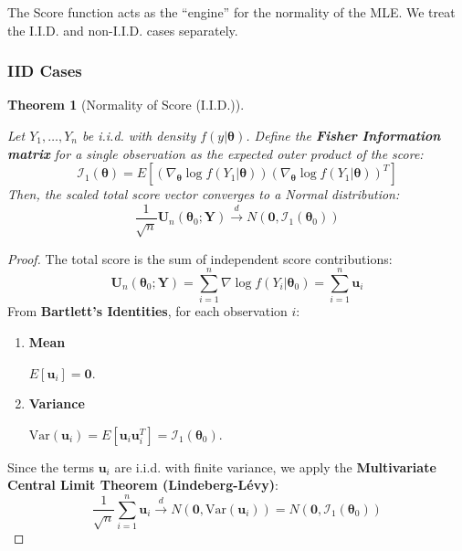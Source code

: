 \documentclass[
  letterpaper,
  DIV=11,
  numbers=noendperiod]{scrreprt}
\renewcommand{\[}{\begin{equation}}
\renewcommand{\]}{\end{equation}}
\theoremstyle{definition}
\theoremstyle{plain}
\theoremstyle{plain}
\theoremstyle{plain}
\newtheorem{theorem}{Theorem}[chapter]
\theoremstyle{definition}
\theoremstyle{plain}
\theoremstyle{remark}
\begin{document}
The Score function acts as the ``engine'' for the normality of the MLE.
We treat the I.I.D. and non-I.I.D. cases separately.

\subsubsection{IID Cases}\label{iid-cases-1}

\begin{theorem}[Normality of Score
(I.I.D.)]\protect\hypertarget{thm-score-normality-iid}{}\label{thm-score-normality-iid}

Let \(Y_1, \dots, Y_n\) be i.i.d. with density
\(f(y|\boldsymbol{\theta})\). Define the \textbf{Fisher Information
matrix} for a single observation as the expected outer product of the
score: \[
\mathcal{I}_1(\boldsymbol{\theta}) = E\left[ \left( \nabla_{\boldsymbol{\theta}} \log f(Y_1|\boldsymbol{\theta}) \right) \left( \nabla_{\boldsymbol{\theta}} \log f(Y_1|\boldsymbol{\theta}) \right)^T \right]
\] Then, the scaled total score vector converges to a Normal
distribution: \[
\frac{1}{\sqrt{n}} \mathbf{U}_n(\boldsymbol{\theta}_0; \mathbf{Y}) \xrightarrow{d} N(\mathbf{0}, \mathcal{I}_1(\boldsymbol{\theta}_0))
\]

\end{theorem}

\begin{proof}
The total score is the sum of independent score contributions: \[
\mathbf{U}_n(\boldsymbol{\theta}_0; \mathbf{Y}) = \sum_{i=1}^n \nabla \log f(Y_i|\boldsymbol{\theta}_0) = \sum_{i=1}^n \mathbf{u}_i
\] From \textbf{Bartlett's Identities}, for each observation \(i\):

\begin{enumerate}
\def\labelenumi{\arabic{enumi}.}
\item
  \textbf{Mean}

  \(E[\mathbf{u}_i] = \mathbf{0}\).
\item
  \textbf{Variance}

  \(\text{Var}(\mathbf{u}_i) = E[\mathbf{u}_i \mathbf{u}_i^T] = \mathcal{I}_1(\boldsymbol{\theta}_0)\).
\end{enumerate}

Since the terms \(\mathbf{u}_i\) are i.i.d. with finite variance, we
apply the \textbf{Multivariate Central Limit Theorem (Lindeberg-Lévy)}:
\[
\frac{1}{\sqrt{n}} \sum_{i=1}^n \mathbf{u}_i \xrightarrow{d} N(\mathbf{0}, \text{Var}(\mathbf{u}_i)) = N(\mathbf{0}, \mathcal{I}_1(\boldsymbol{\theta}_0))
\]
\end{proof}
\end{document}
